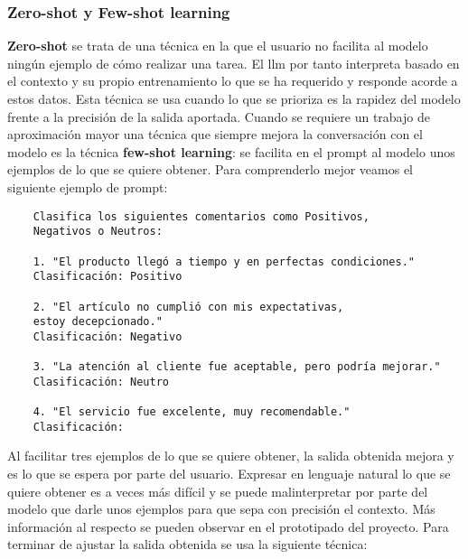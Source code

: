 \subsubsection{Zero-shot y Few-shot learning}
\textbf{Zero-shot} se trata de una técnica en la que el usuario no facilita al modelo ningún ejemplo de cómo realizar una tarea. El \acrshort{llm} por tanto interpreta basado en el contexto y su propio entrenamiento lo que se ha requerido y responde acorde a estos datos. Esta técnica se usa cuando lo que se prioriza es la rapidez del modelo frente a la precisión de la salida aportada. Cuando se requiere un trabajo de aproximación mayor una técnica que siempre mejora la conversación con el modelo es la técnica \textbf{few-shot learning}: se facilita en el prompt al modelo unos ejemplos de lo que se quiere obtener. Para comprenderlo mejor veamos el siguiente ejemplo de prompt: 
\begin{verbatim}
	Clasifica los siguientes comentarios como Positivos, 
	Negativos o Neutros:
	
	1. "El producto llegó a tiempo y en perfectas condiciones."
	Clasificación: Positivo
	
	2. "El artículo no cumplió con mis expectativas, 
	estoy decepcionado."
	Clasificación: Negativo
	
	3. "La atención al cliente fue aceptable, pero podría mejorar."
	Clasificación: Neutro
	
	4. "El servicio fue excelente, muy recomendable."
	Clasificación:
\end{verbatim}

Al facilitar tres ejemplos de lo que se quiere obtener, la salida obtenida mejora y es lo que se espera por parte del usuario. Expresar en lenguaje natural lo que se quiere obtener es a veces más difícil y se puede malinterpretar por parte del modelo que darle unos ejemplos para que sepa con precisión el contexto. Más información al respecto se pueden observar en el prototipado del proyecto. Para terminar de ajustar la salida obtenida se usa la siguiente técnica:

